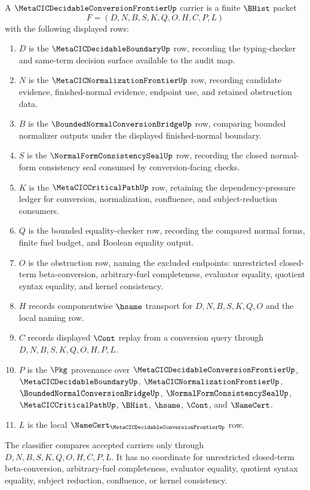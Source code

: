 \begin{definition}
\label{def:metacic-decidable-conversion-frontier-carrier}
A $\MetaCICDecidableConversionFrontierUp$ carrier is a finite $\BHist$ packet
$$
F=(D,N,B,S,K,Q,O,H,C,P,L)
$$
with the following displayed rows:
\begin{enumerate}
\item $D$ is the $\MetaCICDecidableBoundaryUp$ row, recording the typing-checker and same-term decision surface available to the audit map.
\item $N$ is the $\MetaCICNormalizationFrontierUp$ row, recording candidate evidence, finished-normal evidence, endpoint use, and retained obstruction data.
\item $B$ is the $\BoundedNormalConversionBridgeUp$ row, comparing bounded normalizer outputs under the displayed finished-normal boundary.
\item $S$ is the $\NormalFormConsistencySealUp$ row, recording the closed normal-form consistency seal consumed by conversion-facing checks.
\item $K$ is the $\MetaCICCriticalPathUp$ row, retaining the dependency-pressure ledger for conversion, normalization, confluence, and subject-reduction consumers.
\item $Q$ is the bounded equality-checker row, recording the compared normal forms, finite fuel budget, and Boolean equality output.
\item $O$ is the obstruction row, naming the excluded endpoints: unrestricted closed-term beta-conversion, arbitrary-fuel completeness, evaluator equality, quotient syntax equality, and kernel consistency.
\item $H$ records componentwise $\hsame$ transport for $D,N,B,S,K,Q,O$ and the local naming row.
\item $C$ records displayed $\Cont$ replay from a conversion query through $D,N,B,S,K,Q,O,H,P,L$.
\item $P$ is the $\Pkg$ provenance over $\MetaCICDecidableConversionFrontierUp$, $\MetaCICDecidableBoundaryUp$, $\MetaCICNormalizationFrontierUp$, $\BoundedNormalConversionBridgeUp$, $\NormalFormConsistencySealUp$, $\MetaCICCriticalPathUp$, $\BHist$, $\hsame$, $\Cont$, and $\NameCert$.
\item $L$ is the local $\NameCert_{\MetaCICDecidableConversionFrontierUp}$ row.
\end{enumerate}
The classifier compares accepted carriers only through $D,N,B,S,K,Q,O,H,C,P,L$. It has no coordinate for unrestricted closed-term beta-conversion, arbitrary-fuel completeness, evaluator equality, quotient syntax equality, subject reduction, confluence, or kernel consistency.
\end{definition}

